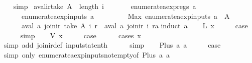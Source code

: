 \begin{isabellebody}
%
\isadelimproof
\ \ %
\endisadelimproof
%
\isatagproof
{}\isamarkupfalse%
\ simp%
\endisatagproof
{\isafoldproof}%
%
\isadelimproof
\isanewline
%
\endisadelimproof
\isanewline
{}\isamarkupfalse%
\ aval{\isacharunderscore}ir{\isacharunderscore}take{\isacharcolon}\ {\isachardoublequoteopen}A\ {\isasymle}\ length\ i\ {\isasymLongrightarrow}\isanewline
\ \ \ \ \ \ enumerate{\isacharunderscore}aexp{\isacharunderscore}regs\ a\ {\isacharequal}\ {\isacharbraceleft}{\isacharbraceright}\ {\isasymLongrightarrow}\isanewline
\ \ \ \ \ \ enumerate{\isacharunderscore}aexp{\isacharunderscore}inputs\ a\ {\isasymnoteq}\ {\isacharbraceleft}{\isacharbraceright}\ {\isasymLongrightarrow}\isanewline
\ \ \ \ \ \ Max\ {\isacharparenleft}enumerate{\isacharunderscore}aexp{\isacharunderscore}inputs\ a{\isacharparenright}\ {\isacharless}\ A\ {\isasymLongrightarrow}\isanewline
\ \ \ \ \ \ aval\ a\ {\isacharparenleft}join{\isacharunderscore}ir\ {\isacharparenleft}take\ A\ i{\isacharparenright}\ r{\isacharparenright}\ {\isacharequal}\ aval\ a\ {\isacharparenleft}join{\isacharunderscore}ir\ i\ ra{\isacharparenright}{\isachardoublequoteclose}\isanewline
%
\isadelimproof
%
\endisadelimproof
%
\isatagproof
{}\isamarkupfalse%
{\isacharparenleft}induct\ a{\isacharparenright}\isanewline
\ \ \isamarkupfalse%
\ {\isacharparenleft}L\ x{\isacharparenright}\isanewline
\ \ \isamarkupfalse%
\ \isamarkupfalse%
\ {\isacharquery}case\isanewline
\ \ \ \ \isamarkupfalse%
\ simp\isanewline
{}\isamarkupfalse%
\isanewline
\ \ \isamarkupfalse%
\ {\isacharparenleft}V\ x{\isacharparenright}\isanewline
\ \ \isamarkupfalse%
\ \isamarkupfalse%
\ {\isacharquery}case\isanewline
\ \ \ \ \isamarkupfalse%
\ {\isacharparenleft}cases\ x{\isacharparenright}\isanewline
\ \ \ \ \ \isamarkupfalse%
\ {\isacharparenleft}simp\ add{\isacharcolon}\ join{\isacharunderscore}ir{\isacharunderscore}def\ input{}state{\isacharunderscore}nth{\isacharparenright}\isanewline
\ \ \ \ \isamarkupfalse%
\ simp\isanewline
{}\isamarkupfalse%
\isanewline
\ \ \isamarkupfalse%
\ {\isacharparenleft}Plus\ a{}\ a{}{\isacharparenright}\isanewline
\ \ \isamarkupfalse%
\ \isamarkupfalse%
\ {\isacharquery}case\isanewline
\ \ \ \ \isamarkupfalse%
\ {\isacharparenleft}simp\ only{\isacharcolon}\ enumerate{\isacharunderscore}aexp{\isacharunderscore}inputs{\isacharunderscore}not{\isacharunderscore}empty{\isacharbrackleft}of\ {\isachardoublequoteopen}Plus\ a{}\ a{}{\isachardoublequoteclose}{\isacharbrackright}{\isacharparenright}\isanewline

\end{isabellebody}
